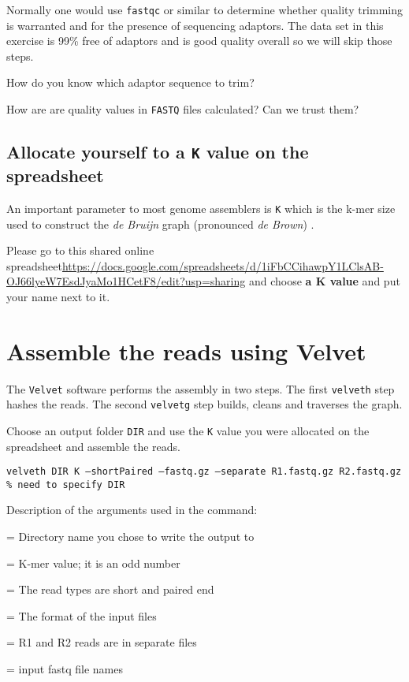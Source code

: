 Normally one would use \texttt{fastqc} or similar to determine whether quality trimming is warranted and for the presence of sequencing adaptors. 
The data set in this exercise is 99\% free of adaptors and is good quality overall so we will skip those steps.
\begin{questions}
How do you know which adaptor sequence to trim?
\begin{answer}
\end{answer}
How are are quality values in \texttt{FASTQ} files calculated? Can we trust them?
\begin{answer}
\end{answer}
\end{questions}

\subsection{Allocate yourself to a \texttt{K} value on the spreadsheet}

An important parameter to most genome assemblers is \texttt{K} which is the k-mer size used to construct the \textit{de Bruijn} graph (pronounced \textit{de Brown}) .

Please go to this shared online spreadsheet\url{https://docs.google.com/spreadsheets/d/1iFbCCihawpY1LClsAB-OJ66lyeW7EsdJyaMo1HCetF8/edit?usp=sharing} and choose \textbf{a K value} and put your name next to it.


\section{Assemble the reads using Velvet}
The \texttt{Velvet} software performs the assembly in two steps. The first \texttt{velveth} step hashes the reads. The second \texttt{velvetg} step builds, cleans and traverses the graph.

\begin{steps}
Choose an output folder \texttt{DIR} and use the \texttt{K} value you were allocated on the spreadsheet and assemble the reads.
\begin{lstlisting}
velveth DIR K –shortPaired –fastq.gz –separate R1.fastq.gz R2.fastq.gz % need to specify DIR
\end{lstlisting}
\end{steps}

Description of the arguments used in the command:
\begin{description}[style=multiline,labelindent=0cm,align=right,leftmargin=\descriptionlabelspace,rightmargin=1.5cm,font=\ttfamily]
  \item[DIR] = Directory name you chose to write the output to
  \item[K] = K-mer value; it is an odd number
  \item[-shortPaired] = The read types are short and paired end
  \item[-fastq.gz] = The format of the input files
  \item[-separate] = R1 and R2 reads are in separate files
  \item[input file names] = input fastq file names
\end{description}


